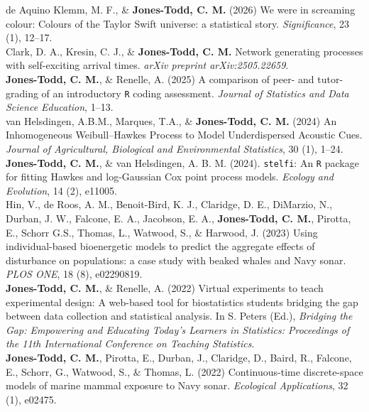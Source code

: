 \documentclass[10pt,a4paper]{moderncv}
\begin{document}
  de Aquino Klemm, M. F., \&  \textbf{Jones-Todd, C. M.} (2026) We were in screaming colour: Colours of the Taylor Swift universe: a statistical story. \textit{ Significance}, 23 (1), 12--17.\\

Clark, D. A., Kresin, C. J., \&  \textbf{Jones-Todd, C. M.} Network generating processes with self-exciting arrival times. \textit{arXiv preprint arXiv:2505.22659}.\\

\textbf{Jones-Todd, C. M.}, \& Renelle, A. (2025) A comparison of peer- and tutor-grading of an introductory \texttt{R} coding assessment. \textit{Journal of Statistics and Data Science Education}, 1--13.\\

  van Helsdingen, A.B.M., Marques, T.A., \& \textbf{Jones-Todd, C. M.} (2024) An Inhomogeneous Weibull–Hawkes Process to Model Underdispersed Acoustic Cues. \textit{Journal of Agricultural, Biological and Environmental Statistics}, 30 (1), 1--24.\\

  \textbf{Jones-Todd, C. M.}, \& van Helsdingen, A. B. M. (2024). \texttt{stelfi}: An \texttt{R} package for fitting Hawkes and log-Gaussian Cox point process models. \textit{Ecology and Evolution}, 14 (2), e11005.\\

  Hin, V., de Roos, A. M., Benoit-Bird, K. J., Claridge, D. E., DiMarzio, N.,  Durban, J. W., Falcone, E. A., Jacobson, E. A., \textbf{Jones-Todd, C. M.}, Pirotta, E., Schorr G.S., Thomas, L., Watwood, S., \& Harwood, J. (2023) Using individual-based bioenergetic models to predict the aggregate effects of disturbance on populations: a case study with beaked whales and Navy sonar. \textit{PLOS ONE}, 18 (8), e02290819.\\

  \textbf{Jones-Todd, C. M.}, \& Renelle, A. (2022) Virtual experiments to teach experimental design: A web-based tool for biostatistics students bridging the gap between data collection and statistical analysis. In S. Peters (Ed.), \textit{Bridging the Gap: Empowering and Educating Today's Learners in Statistics: Proceedings of the 11th International Conference on Teaching Statistics}.\\
  
  \textbf{Jones-Todd, C. M.}, Pirotta, E., Durban, J., Claridge, D., Baird, R., Falcone, E., Schorr, G., Watwood, S., \& Thomas, L.  (2022) Continuous-time discrete-space models of marine mammal exposure to Navy sonar. \textit{Ecological Applications}, 32 (1), e02475.\\
 
\end{document}
